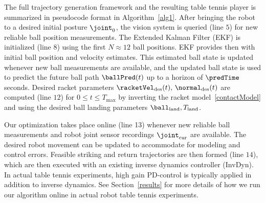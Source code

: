 
The full trajectory generation framework and the resulting table tennis player is summarized in pseudocode format in Algorithm~\ref{alg1}. After bringing the robot to a desired initial posture $\joint_0$, the vision system is queried (line $5$) for new reliable ball position measurements. The Extended Kalman Filter (EKF) is initialized (line $8$) using the first $N \approx 12$ ball positions. EKF provides then with initial ball position and velocity estimates. This estimated ball state is updated whenever new ball measurements are available, and the updated ball state is used to predict the future ball path $\ballPred(t)$ up to a horizon of $\predTime$ seconds. Desired racket parameters $\racketVel_{\mathrm{des}}(t), \, \normal_{\mathrm{des}}(t)$ are computed (line $12$) for $0 \leq t \leq T_{\mathrm{max}}$ by inverting the racket model~\eqref{contactModel} and using the desired ball landing parameters $\ball_{\mathrm{land}}, T_{\mathrm{land}}$. 

Our optimization takes place online (line 13) whenever new reliable ball measurements and robot joint sensor recordings $\joint_{\mathrm{cur}}$ are available. The desired robot movement can be updated to accommodate for modeling and control errors. Feasible striking and return trajectories are then formed (line $14$), which are then executed with an existing inverse dynamics controller (InvDyn). In actual table tennis experiments, high gain PD-control is typically applied in addition to inverse dynamics. See Section~\ref{results} for more details of how we run our algorithm online in actual robot table tennis experiments.